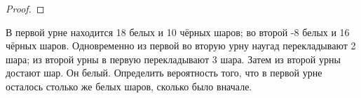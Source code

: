 \begin{proof}
\end{proof}

\begin{problem}
В первой урне находится 18 белых и 10 чёрных шаров; во второй -8 белых и 16 чёрных шаров. Одновременно из первой во вторую урну наугад перекладывают 2 шара; из второй урны в первую перекладывают 3 шара. Затем из второй урны достают шар. Он белый. Определить вероятность того, что в первой урне осталось столько же белых шаров, сколько было вначале.
\end{problem}

